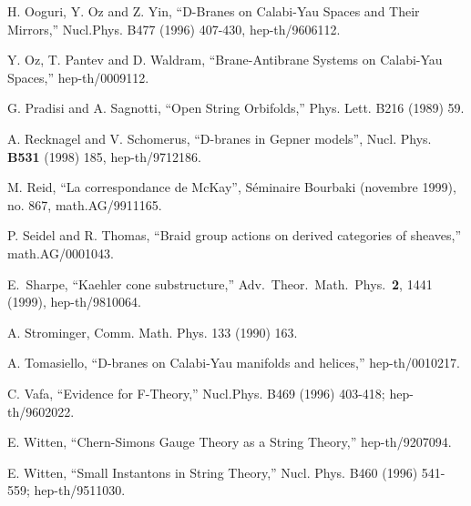 \documentclass[a4paper,12pt]{amsart}
\numberwithin{equation}{section}
\theoremstyle{plain}
\theoremstyle{definition}
\begin{document}
\begin{thebibliography}{10}
H. Ooguri, Y. Oz and Z. Yin,
``D-Branes on Calabi-Yau Spaces and Their Mirrors,''
Nucl.Phys. B477 (1996) 407-430, hep-th/9606112.

Y. Oz, T. Pantev and D. Waldram,
``Brane-Antibrane Systems on Calabi-Yau Spaces,'' hep-th/0009112.

G. Pradisi and A. Sagnotti,
``Open String Orbifolds,''
Phys. Lett. B216 (1989) 59.

A. Recknagel and V. Schomerus, ``D-branes in Gepner models'',
  Nucl. Phys. {\bf B531} (1998) 185, hep-th/9712186.

M. Reid, ``La correspondance de McKay'', S\'eminaire
  Bourbaki (novembre 1999), no. 867, math.AG/9911165.

P. Seidel and R. Thomas, ``Braid group actions on
derived categories of sheaves,'' math.AG/0001043.

E.~Sharpe, ``Kaehler cone substructure,''
Adv.\ Theor.\ Math.\ Phys.\  {\bf 2}, 1441 (1999), hep-th/9810064.

A. Strominger, Comm. Math. Phys. 133 (1990) 163.
	
A. Tomasiello, ``D-branes on Calabi-Yau manifolds and helices,''
hep-th/0010217.

C. Vafa,
``Evidence for F-Theory,''
Nucl.Phys. B469 (1996) 403-418; hep-th/9602022.

E. Witten, ``Chern-Simons Gauge Theory as a String
Theory,'' hep-th/9207094.

E. Witten, ``Small Instantons in String Theory,''
Nucl. Phys. B460 (1996) 541-559; hep-th/9511030.

\end{thebibliography}
\end{document}
